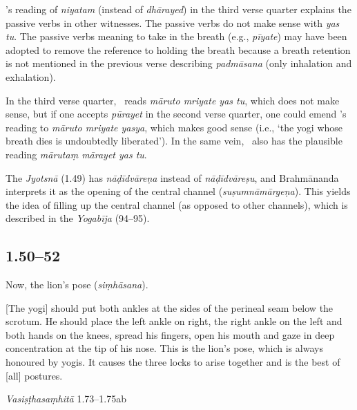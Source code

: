 \begin{ekdosis}
\begin{philcomm}[hp01_049]
\gammaOne's reading of \emph{niyatam} (instead of \emph{dhārayed}) in the third verse quarter explains the passive verbs in other witnesses. The passive verbs do not make sense with \emph{yas tu}. The passive verbs meaning to take in the breath (e.g., \emph{pīyate}) may have been adopted to remove the reference to holding the breath because a breath retention is not mentioned in the previous verse describing \emph{padmāsana} (only inhalation and exhalation). 

In the third verse quarter, \alphaOne\ reads \emph{māruto mriyate yas tu}, which does not make sense, but if one accepts \emph{pūrayet} in the second verse quarter, one could emend \textalpha's reading to \emph{māruto mriyate yasya}, which makes good sense (i.e., `the yogi whose breath dies is undoubtedly liberated'). In the same vein, \alphaTwo\ also has the plausible reading \emph{mārutaṃ mārayet yas tu}. 


The \emph{Jyotsnā} (1.49) has \emph{nāḍīdvāreṇa} instead of \emph{nāḍīdvāreṣu}, and Brahmānanda interprets it as the opening of the central channel (\emph{suṣumnāmārgeṇa}). This yields the idea of filling up the central channel (as opposed to other channels), which is described in the \emph{Yogabīja} (94–95). 
\end{philcomm}

\subsection*{1.50--52}
\begin{translation}[hp01_050]
Now, the lion’s pose (\emph{siṃhāsana}).

[The yogi] should put both ankles at the sides of the perineal seam below the scrotum. He should place the left ankle on right, the right ankle on the left and both hands on the knees, spread his fingers, open his mouth and gaze in deep concentration at the tip of his nose. This is the lion’s pose, which is always honoured by yogis. It causes the three locks to arise together and is the best of [all] postures.
\end{translation}

\begin{sources}[hp01_050]
\emph{Vasiṣṭhasaṃhitā} 1.73–1.75ab


\end{sources}
\end{ekdosis}
